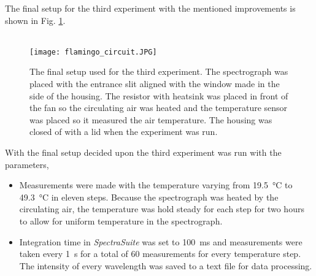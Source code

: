 The final setup for the third experiment with the mentioned improvements is shown in Fig. \ref{fig: temp setup final}.
\\
\\
\begin{figure}[h]
\centering
\texttt{[image: flamingo\_circuit.JPG]}
\caption{The final setup used for the third experiment. The spectrograph was placed with the entrance slit aligned with the window made in the side of the housing. The resistor with heatsink was placed in front of the fan so the circulating air was heated and the temperature sensor was placed so it measured the air temperature. The housing was closed of with a lid when the experiment was run.}
\label{fig: temp setup final}
\end{figure}

With the final setup decided upon the third experiment was run with the parameters,
\begin{itemize}
\item Measurements were made with the temperature varying from \SI{19.5}{\degreeCelsius} to \SI{49.3}{\degreeCelsius} in eleven steps. Because the spectrograph was heated by the circulating air, the temperature was hold steady for each step for two hours to allow for uniform temperature in the spectrograph.
\item Integration time in \emph{SpectraSuite} was set to \SI{100}{\milli\second} and measurements were taken every \SI{1}{\second} for a total of \num{60} measurements for every temperature step. The intensity of every wavelength was saved to a text file for data processing. 
\end{itemize}






